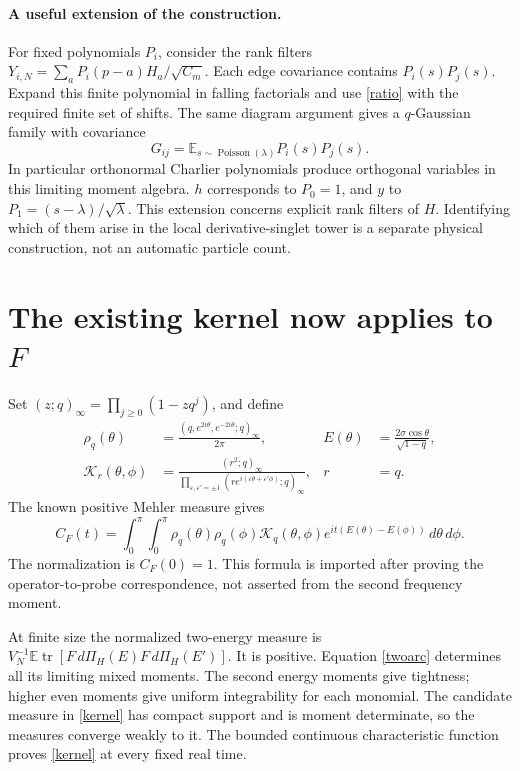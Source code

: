 \documentclass[11pt,a4paper]{article}
\newcommand{\E}{\mathbb E}
\newcommand{\tr}{\operatorname{tr}}
\begin{document}
\paragraph{A useful extension of the construction.}
For fixed polynomials $P_i$, consider the rank filters
$Y_{i,N}=\sum_a P_i(p-a)H_a/\sqrt{C_m}$.
Each edge covariance contains $P_i(s)P_j(s)$. Expand this
finite polynomial in falling factorials and use \eqref{ratio}
with the required finite set of shifts. The same diagram argument
gives a $q$-Gaussian family with covariance
\[
 G_{ij}=\E_{s\sim\operatorname{Poisson}(\lambda)}P_i(s)P_j(s).
\]
In particular orthonormal Charlier polynomials produce orthogonal
variables in this limiting moment algebra. $h$ corresponds to
$P_0=1$, and $y$ to $P_1=(s-\lambda)/\sqrt\lambda$.
This extension concerns explicit rank filters of $H$. Identifying
which of them arise in the local derivative-singlet tower is a
separate physical construction, not an automatic particle count.

\newpage
\section{The existing kernel now applies to $F$}
Set $(z;q)_\infty=\prod_{j\geq0}(1-zq^j)$, and define
\begin{align}
 \rho_q(\theta)&=\frac{(q,e^{2i\theta},e^{-2i\theta};q)_\infty}{2\pi},
 &E(\theta)&=\frac{2\sigma\cos\theta}{\sqrt{1-q}},\\
 \mathcal K_r(\theta,\phi)&=
 \frac{(r^2;q)_\infty}
 {\prod_{\varepsilon,\varepsilon'=\pm1}
 (r e^{i(\varepsilon\theta+\varepsilon'\phi)};q)_\infty},
 &r&=q.
\end{align}
The known positive Mehler measure \cite{tall,bnr} gives
\begin{equation}
 C_F(t)=\int_0^\pi\!\!\int_0^\pi
 \rho_q(\theta)\rho_q(\phi)\mathcal K_q(\theta,\phi)
 e^{it(E(\theta)-E(\phi))}\,d\theta\,d\phi.       \label{kernel}
\end{equation}
The normalization is $C_F(0)=1$. This formula is imported after
proving the operator-to-probe correspondence, not asserted from
the second frequency moment.

At finite size the normalized two-energy measure is
$V_N^{-1}\E\tr[F\,d\Pi_H(E)F\,d\Pi_H(E')]$.
It is positive. Equation \eqref{twoarc} determines all its
limiting mixed moments. The second energy moments give tightness;
higher even moments give uniform integrability for each monomial.
The candidate measure in \eqref{kernel} has compact support and
is moment determinate, so the measures converge weakly to it.
The bounded continuous characteristic function proves
\eqref{kernel} at every fixed real time.
\end{document}
